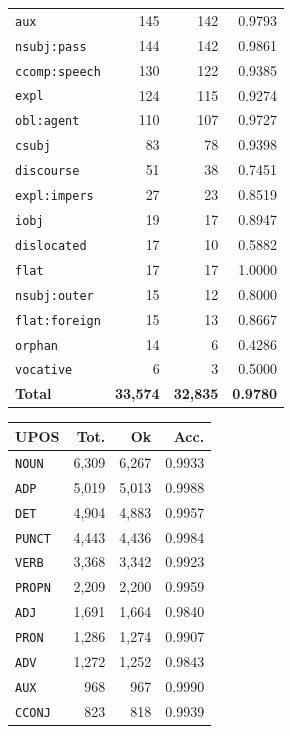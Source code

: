 \begin{table}[ht]
\begin{minipage}[t]{0.55\linewidth}
\begin{tabular}{lrrr}
\texttt{aux} & 145 & 142 & 0.9793 \\
\texttt{nsubj\!:\!pass} & 144 & 142 & 0.9861 \\
\texttt{ccomp\!:\!speech} & 130 & 122 & 0.9385 \\
\texttt{expl} & 124 & 115 & 0.9274 \\
\texttt{obl\!:\!agent} & 110 & 107 & 0.9727 \\
\texttt{csubj} & 83 & 78 & 0.9398 \\
\texttt{discourse} & 51 & 38 & 0.7451 \\
\texttt{expl\!:\!impers} & 27 & 23 & 0.8519 \\
\texttt{iobj} & 19 & 17 & 0.8947 \\
\texttt{dislocated} & 17 & 10 & 0.5882 \\
\texttt{flat} & 17 & 17 & 1.0000 \\
\texttt{nsubj\!:\!outer} & 15 & 12 & 0.8000 \\
\texttt{flat\!:\!foreign} & 15 & 13 & 0.8667 \\
\texttt{orphan} & 14 & 6 & 0.4286 \\
\texttt{vocative} & 6 & 3 & 0.5000 \\
\midrule
\textbf{Total} & \textbf{33,574} & \textbf{32,835} & \textbf{0.9780} \\
\bottomrule
\end{tabular}
\end{minipage}
\hfill
\begin{minipage}[t]{0.42\linewidth}
\centering\scriptsize
\begin{tabular}{lrrr}
\toprule
\textbf{UPOS} & \textbf{Tot.} & \textbf{Ok} & \textbf{Acc.} \\
\midrule
\texttt{NOUN} & 6,309 & 6,267 & 0.9933 \\
\texttt{ADP} & 5,019 & 5,013 & 0.9988 \\
\texttt{DET} & 4,904 & 4,883 & 0.9957 \\
\texttt{PUNCT} & 4,443 & 4,436 & 0.9984 \\
\texttt{VERB} & 3,368 & 3,342 & 0.9923 \\
\texttt{PROPN} & 2,209 & 2,200 & 0.9959 \\
\texttt{ADJ} & 1,691 & 1,664 & 0.9840 \\
\texttt{PRON} & 1,286 & 1,274 & 0.9907 \\
\texttt{ADV} & 1,272 & 1,252 & 0.9843 \\
\texttt{AUX} & 968 & 967 & 0.9990 \\
\texttt{CCONJ} & 823 & 818 & 0.9939 \\

\end{tabular}
\end{minipage}
\end{table}
